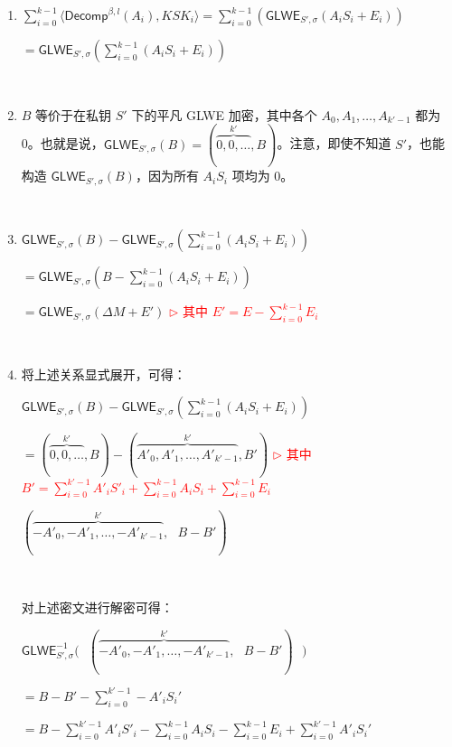 \begin{myproof}
\begin{enumerate}
 \item $\sum \limits_{i=0}^{k-1} \langle \textsf{Decomp}^{\beta, l}(A_i), \mathit{KSK}_i \rangle = \sum \limits_{i=0}^{k-1} (\textsf{GLWE}_{S', \sigma} ( 
 A_i  S_i  + E_i)) $ 
 
 $= \textsf{GLWE}_{S', \sigma} \left ( \sum \limits_{i=0}^{k-1}  
 (A_i  S_i   + E_i) \right ) $

$ $
 
\item $B$ 等价于在私钥 $S'$ 下的平凡 GLWE 加密，其中各个 $A_0, A_1, \ldots, A_{k'-1}$ 都为 0。也就是说，$\textsf{GLWE}_{S', \sigma}(B) = (\overbrace{0, 0, \ldots}^{k'}, B)$。注意，即使不知道 $S'$，也能构造 $\textsf{GLWE}_{S', \sigma}(B)$，因为所有 $A_iS_i$ 项均为 0。

$ $
 
 \item $\textsf{GLWE}_{S', \sigma}(B) - \textsf{GLWE}_{S', \sigma} \left( \sum \limits_{i=0}^{k-1} (A_i  S_i + E_i )\right) $
 
 $= \textsf{GLWE}_{S', \sigma}(B - \sum \limits_{i=0}^{k-1} (A_i  S_i + E_i)) $
 
$= \textsf{GLWE}_{S', \sigma}(\Delta M + E')$ \textcolor{red}{ $\rhd$ 其中 $E' = E - \sum\limits_{i=0}^{k-1}E_i$}

$ $

\item 将上述关系显式展开，可得：

$\textsf{GLWE}_{S', \sigma}(B) - \textsf{GLWE}_{S', \sigma} \left(\sum \limits_{i=0}^{k-1} (A_i  S_i + E_i)\right)$

$ = (\overbrace{0, 0, \ldots}^{k'}, B) - (\overbrace{A'_0, A'_1, \ldots, A'_{k'-1}}^{k'}, B')  $ \text { } \textcolor{red}{ $\rhd$ 其中 $B' = \sum\limits_{i=0}^{k'-1} A'_iS'_i + \sum\limits_{i=0}^{k-1} A_iS_i + \sum\limits_{i=0}^{k-1}E_i$}

$(\overbrace{-A'_0, -A'_1, \ldots, -A'_{k'-1}}^{k'}, \text{ } B - B')$

$ $

对上述密文进行解密可得：

$ \textsf{GLWE}_{S', \sigma}^{-1} \bm{\Big(} \text{ } (\overbrace{-A'_0, -A'_1, \ldots, -A'_{k'-1}}^{k'}, \text{ } B - B') \text{ } \bm{\Big)}$

$ = B -  B' - \sum\limits_{i=0}^{k'-1} -A'_iS_i'$

$= B - \sum\limits_{i=0}^{k'-1} A'_iS'_i - \sum\limits_{i=0}^{k-1} A_iS_i - \sum\limits_{i=0}^{k-1}E_i + \sum\limits_{i=0}^{k'-1} A'_iS_i'$


\end{enumerate}
\end{myproof}
